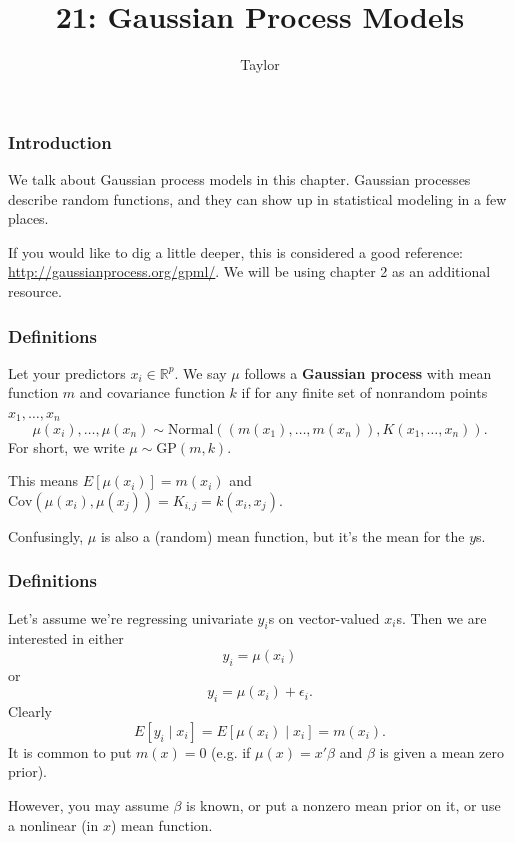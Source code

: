 \documentclass{beamer}
\title["21"]{21: Gaussian Process Models}
\author{Taylor}
\institute[UVA] 
{
University of Virginia \\
\medskip
\textit{} 
}
\date{}
\begin{document}

\begin{frame}
\titlepage 
\end{frame}

\begin{frame}
\frametitle{Introduction}

We talk about Gaussian process models in this chapter. Gaussian processes describe random functions, and they can show up in statistical modeling in a few places. 
\newline

If you would like to dig a little deeper, this is considered a good reference: \url{http://gaussianprocess.org/gpml/}. We will be using chapter 2 as an additional resource.

\end{frame}
\begin{frame}
\frametitle{Definitions}

Let your predictors $x_i \in \mathbb{R}^p$. We say $\mu$ follows a {\bf Gaussian process} with mean function $m$ and covariance function $k$ if for any finite set of nonrandom points $x_1, \ldots, x_n$
$$
\mu(x_i), \ldots, \mu(x_n) \sim \text{Normal}( (m(x_1), \ldots, m(x_n)), K(x_1, \ldots, x_n)).
$$
For short, we write $\mu \sim \text{GP}(m,k)$. 
\pause
\newline

This means $E[\mu(x_i)] = m(x_i)$ and $\text{Cov}(\mu(x_i), \mu(x_j)) = K_{i,j} = k(x_i,x_j)$.
\newline

Confusingly, $\mu$ is also a (random) mean function, but it's the mean for the $y$s.
\newline

\end{frame}

\begin{frame}
\frametitle{Definitions}

Let's assume we're regressing univariate $y_i$s on vector-valued $x_i$s. Then we are interested in either
$$
y_i = \mu(x_i) 
$$
or
$$
y_i = \mu(x_i) + \epsilon_i.
$$
Clearly
$$
E[y_i \mid x_i] = E[\mu(x_i) \mid x_i] = m(x_i).
$$
It is common to put $m(x) = 0$ (e.g. if $\mu(x) = x'\beta$ and $\beta$ is given a mean zero prior).
\newline

However, you may assume $\beta$ is known, or put a nonzero mean prior on it, or use a nonlinear (in $x$) mean function.
\newline

\end{frame}
\end{document}
